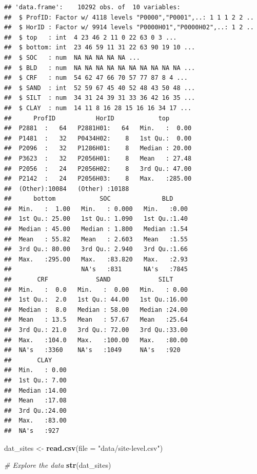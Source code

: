 \documentclass[10pt,b5paper,]{book}
\newenvironment{Shaded}{\begin{snugshade}}{\end{snugshade}}
\newcommand{\CommentTok}[1]{\textcolor[rgb]{0.56,0.35,0.01}{\textit{#1}}}
\newcommand{\DataTypeTok}[1]{\textcolor[rgb]{0.13,0.29,0.53}{#1}}
\newcommand{\KeywordTok}[1]{\textcolor[rgb]{0.13,0.29,0.53}{\textbf{#1}}}
\newcommand{\NormalTok}[1]{#1}
\newcommand{\StringTok}[1]{\textcolor[rgb]{0.31,0.60,0.02}{#1}}
\theoremstyle{definition}
\theoremstyle{definition}
\theoremstyle{definition}
\theoremstyle{remark}
\begin{document}
\begin{verbatim}
## 'data.frame':    10292 obs. of  10 variables:
##  $ ProfID: Factor w/ 4118 levels "P0000","P0001",..: 1 1 1 2 2 ..
##  $ HorID : Factor w/ 9914 levels "P0000H01","P0000H02",..: 1 2 ..
##  $ top   : int  4 23 46 2 11 0 22 63 0 3 ...
##  $ bottom: int  23 46 59 11 31 22 63 90 19 10 ...
##  $ SOC   : num  NA NA NA NA NA ...
##  $ BLD   : num  NA NA NA NA NA NA NA NA NA NA ...
##  $ CRF   : num  54 62 47 66 70 57 77 87 8 4 ...
##  $ SAND  : int  52 59 67 45 40 52 48 43 50 48 ...
##  $ SILT  : num  34 31 24 39 31 33 36 42 16 35 ...
##  $ CLAY  : num  14 11 8 16 28 15 16 16 34 17 ...
##      ProfID           HorID            top        
##  P2881  :   64   P2881H01:   64   Min.   :  0.00  
##  P1481  :   32   P0434H02:    8   1st Qu.:  0.00  
##  P2096  :   32   P1286H01:    8   Median : 20.00  
##  P3623  :   32   P2056H01:    8   Mean   : 27.48  
##  P2056  :   24   P2056H02:    8   3rd Qu.: 47.00  
##  P2142  :   24   P2056H03:    8   Max.   :285.00  
##  (Other):10084   (Other) :10188                   
##      bottom            SOC              BLD      
##  Min.   :  1.00   Min.   : 0.000   Min.   :0.00  
##  1st Qu.: 25.00   1st Qu.: 1.090   1st Qu.:1.40  
##  Median : 45.00   Median : 1.800   Median :1.54  
##  Mean   : 55.82   Mean   : 2.603   Mean   :1.55  
##  3rd Qu.: 80.00   3rd Qu.: 2.940   3rd Qu.:1.66  
##  Max.   :295.00   Max.   :83.820   Max.   :2.93  
##                   NA's   :831      NA's   :7845  
##       CRF             SAND             SILT      
##  Min.   :  0.0   Min.   :  0.00   Min.   : 0.00  
##  1st Qu.:  2.0   1st Qu.: 44.00   1st Qu.:16.00  
##  Median :  8.0   Median : 58.00   Median :24.00  
##  Mean   : 13.5   Mean   : 57.67   Mean   :25.64  
##  3rd Qu.: 21.0   3rd Qu.: 72.00   3rd Qu.:33.00  
##  Max.   :104.0   Max.   :100.00   Max.   :80.00  
##  NA's   :3360    NA's   :1049     NA's   :920    
##       CLAY      
##  Min.   : 0.00  
##  1st Qu.: 7.00  
##  Median :14.00  
##  Mean   :17.08  
##  3rd Qu.:24.00  
##  Max.   :83.00  
##  NA's   :927
\end{verbatim}

\begin{Shaded}
\begin{Highlighting}[]
\NormalTok{dat_sites <-}\StringTok{ }\KeywordTok{read.csv}\NormalTok{(}\DataTypeTok{file =} \StringTok{"data/site-level.csv"}\NormalTok{)}

\CommentTok{# Explore the data}
\KeywordTok{str}\NormalTok{(dat_sites)}
\end{Highlighting}
\end{Shaded}
\end{document}

